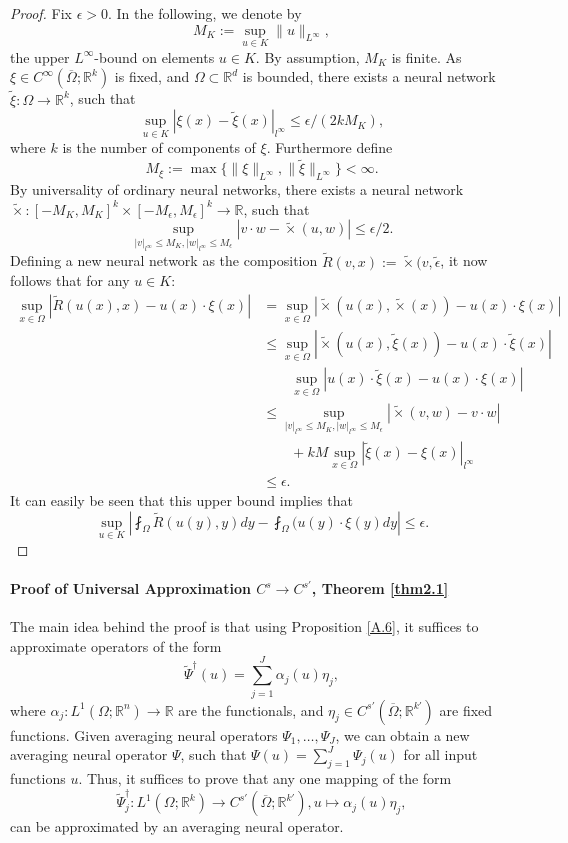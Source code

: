 \documentclass[reqno]{amsart}
\theoremstyle{plain}
\theoremstyle{definition}
\newcommand{\bb}[1]{\mathbb{#1}}
\begin{document}
\begin{proof}
    Fix $\epsilon > 0$. In the following, we denote by
    $$ M_K := \sup_{u\in K}\|u\|_{L^\infty},$$
    the upper $L^\infty$-bound on elements $u \in K$. By assumption, $M_K$ is finite. As $\xi \in C^\infty(\overline{\Omega};\bb R^k)$ is fixed, and $\Omega \subset \bb R^d$ is bounded, there exists a neural network $\tilde{\xi}: \Omega \to \bb R^k$, such that 
    $$ \sup_{u \in K}|\xi(x) - \tilde{\xi}(x)|_{l^\infty} \leq \epsilon/(2kM_K),$$
    where $k$ is the number of components of $\xi$. Furthermore define
    $$ M_{\xi} := \max\{\|\xi\|_{L^\infty}, \|\tilde{\xi}\|_{L^\infty}\} < \infty.$$
    By universality of ordinary neural networks, there exists a neural network $\tilde{\times} : [-M_K,M_K]^k \times [-M_\epsilon,M_\epsilon]^k \to \bb R$, such that
    $$ \sup_{|v|_{l^\infty}\leq M_K,|w|_{l^\infty}\leq M_\epsilon} |v\cdot w - \tilde{\times}(u,w)| \leq \epsilon/2.$$
    Defining a new neural network as the composition $\tilde{R}(v,x):= \tilde{\times}(v,\tilde{\epsilon}$, it now follows that for any $u \in K$: 
    $$
    \begin{aligned}
        \sup_{x\in \Omega}|\tilde{R}(u(x),x) - u(x)\cdot\xi(x)| &= \sup_{x\in \Omega} |\tilde{\times}(u(x),\tilde{\times}(x)) - u(x) \cdot \xi(x)| \\
        &\leq \sup_{x\in \Omega}|\tilde{\times}(u(x), \tilde{\xi}(x)) - u(x)\cdot \tilde{\xi}(x)| \\
        &\qquad \sup_{x\in \Omega}|u(x) \cdot \tilde{\xi}(x) - u(x) \cdot \xi(x)|\\
        &\leq \sup_{|v|_{l^\infty}\leq M_K,|w|_{l^\infty}\leq M_\epsilon} |\tilde{\times}(v,w) - v \cdot w| \\
        &\qquad +kM \sup_{x \in \Omega}|\tilde{\xi}(x) - \xi(x)|_{l^\infty} \\
        &\leq \epsilon.
    \end{aligned}
    $$
    It can easily be seen that this upper bound implies that
    $$ \sup_{u \in K}\left|\fint_{\Omega}\tilde{R}(u(y),y) dy - \fint_{\Omega}(u(y)\cdot \xi(y) dy \right| \leq \epsilon.$$
\end{proof}

\paragraph{\bf Proof of Universal Approximation $C^s \to C^{s'}$, Theorem \ref{thm2.1}}The main idea behind the proof is that using Proposition \ref{A.6}, it suffices to approximate operators of the form
$$ \tilde{\Psi}^\dag(u) = \sum_{j=1}^{J} \alpha_j(u)\eta_j,$$
where $\alpha_j : L^1(\Omega; \bb R^n) \to \bb R$ are the functionals, and $\eta_j \in C^{s'}(\overline{\Omega};\bb R^{k'})$ are fixed functions. Given averaging neural operators $\Psi_1, \dots, \Psi_J$, we can obtain a new averaging neural operator $\Psi$, such that $\Psi(u) = \sum_{j=1}^{J}\Psi_j(u)$ for all input functions $u$. Thus, it suffices to prove that any one mapping of the form 
$$ \tilde{\Psi}_j^\dag : L^1(\Omega;\bb R^k) \to C^{s'}(\overline{\Omega};\bb R^{k'}), u \mapsto \alpha_j (u) \eta_j,$$
can be approximated by an averaging neural operator.
\end{document}
